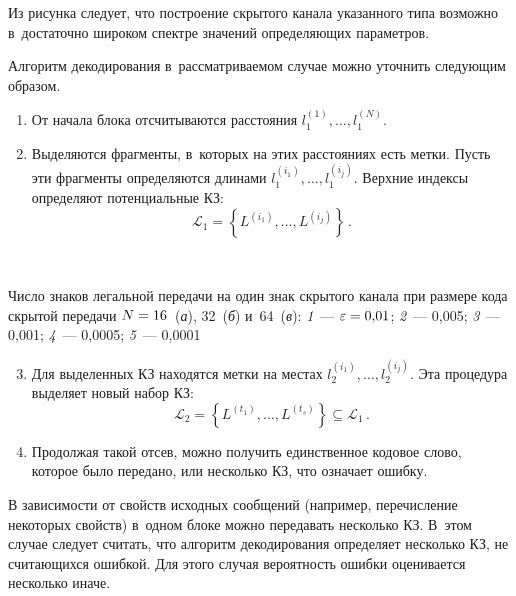 \begin{multicols}{2}
  
  Из рисунка следует, что построение скрытого канала указанного типа 
возможно в~достаточно широком спектре значений определяющих па\-ра\-мет\-ров.
  
  Алгоритм декодирования в~рассматриваемом случае можно уточнить 
следующим образом. 
  \begin{enumerate}[1.]
\item От начала блока отсчитываются расстояния $l_1^{(1)},\ldots, l_1^{(N)}$.

\item Выделяются фрагменты, в~которых на этих расстояниях есть метки. 
Пусть эти фрагменты определяются длинами $l_1^{(i_1)},\ldots, l_1^{(i_j)}$. 
Верхние индексы определяют потенциальные КЗ: 
$$
\mathcal{L}_1= \left\{ L^{(i_1)}, \ldots, L^{(i_j)}\right\}\,.
$$
\end{enumerate} 
         \vspace*{-8pt}
 \begin{center}
 \mbox{%
 \epsfxsize=77.853mm
 }
 \end{center}
{\small Число знаков легальной передачи на один знак скрытого канала при размере 
кода скрытой передачи $N\hm=16$~(\textit{а}), 32~(\textit{б}) и~64~(\textit{в}): \textit{1}~--- $\varepsilon\hm=0{,}01$; 
\textit{2}~--- 0,005; \textit{3}~--- 0,001; \textit{4}~--- 0,0005; \textit{5}~---
0,0001}

\vspace*{28pt}

  \noindent
  \begin{enumerate}[1.]
  \setcounter{enumi}{2}
\item Для выделенных КЗ находятся метки на местах $l_2^{(i_1)},\ldots, 
l_2^{(i_j)}$. Эта процедура выделяет новый набор КЗ: 
$$
\mathcal{L}_2= \left\{ L^{(t_1)}, \ldots , L^{(t_s)}\right\} \subseteq 
\mathcal{L}_1\,.
$$
\item Продолжая такой отсев, можно получить единственное кодовое слово, 
которое было передано, или несколько КЗ, что означает ошибку. 
\end{enumerate}

  В зависимости от свойств исходных сообщений (например, перечисление 
некоторых свойств) в~одном блоке можно передавать несколько КЗ. В~этом 
случае следует считать, что алгоритм декодирования определяет несколько КЗ, 
не считающихся ошибкой. Для этого случая вероятность ошибки оценивается 
несколько иначе. 
  

\end{multicols}
